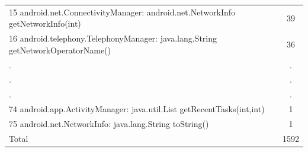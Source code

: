 \begin{table}[t]
\begin{tabular}{lc}
   15 android.net.ConnectivityManager: android.net.NetworkInfo getNetworkInfo(int) &  39 \\
   16 android.telephony.TelephonyManager: java.lang.String getNetworkOperatorName() &  36 \\
   .&  .\\
   .&  .\\
   .&  .\\
   74 android.app.ActivityManager: java.util.List getRecentTasks(int,int) & 1 \\
   75 android.net.NetworkInfo: java.lang.String toString() & 1 \\

 \bottomrule
                            Total & 1592 \\

 \end{tabular}
 \label{tab:APIused}
\end{table}






